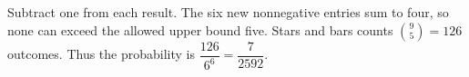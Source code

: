Subtract one from each result. The six new nonnegative entries sum to four, so none can exceed the allowed upper bound five. Stars and bars counts $\binom95=126$ outcomes. Thus the probability is $\dfrac{126}{6^6}=\boxed{\dfrac{7}{2592}}$.
